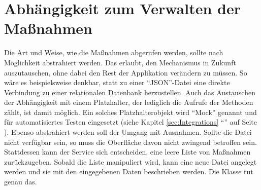 
\ifodd\value{page}\hbox{}\newpage\fi
\section{ Abhängigkeit zum Verwalten der Maßnahmen}

Die Art und Weise, wie die Maßnahmen abgerufen werden, sollte nach Möglichkeit abstrahiert werden.
Das erlaubt, den Mechanismus in Zukunft auszutauschen, ohne dabei den Rest der Applikation verändern zu müssen.
So wäre es beispielsweise denkbar, statt zu einer \enquote{JSON}-Datei eine direkte Verbindung zu einer relationalen Datenbank herzustellen.
Auch das Austauschen der Abhängigkeit mit einem Platzhalter, der lediglich die Aufrufe der Methoden zählt, ist damit möglich.
Ein solches Platzhalterobjekt wird \enquote{Mock} genannt und für automatisiertes Testen eingesetzt (siehe Kapitel \ref{sec:Integrations} \enquote{} auf Seite \pageref{sec:Integrations}). 
Ebenso abstrahiert werden soll der Umgang mit Ausnahmen.
Sollte die Datei nicht verfügbar sein, so muss die Oberfläche davon nicht zwingend betroffen sein.
Stattdessen kann der Service sich entscheiden, eine leere Liste von Maßnahmen zurückzugeben.
Sobald die Liste manipuliert wird, kann eine neue Datei angelegt werden und sie mit den eingegebenen Daten beschrieben werden.
Die Klasse  \Lst{\ref{lst:Schritt1KlasseMassnahmenModel}} tut genau das.



